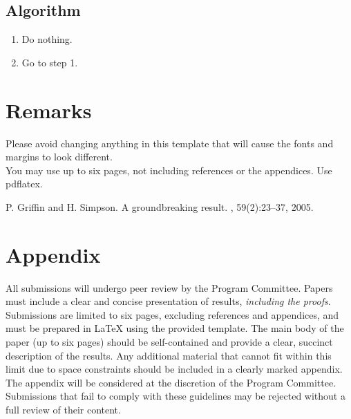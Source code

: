 \documentclass{cccg25}
\begin{document}
\subsection{Algorithm}

\begin{enumerate}
\item
Do nothing.
\item
Go to step 1.
\end{enumerate}




\section{Remarks}   %
Please avoid changing anything in this template that will cause the fonts and margins to look different.\\
You may use up to six pages, not including references or the appendices.
Use pdflatex.\\



\small


\begin{thebibliography}{99}

P. Griffin and H. Simpson.
\newblock A groundbreaking result.
, 59(2):23--37, 2005.

\end{thebibliography}


\newpage
\section*{Appendix}
All submissions will undergo peer review by the Program Committee. Papers must include a clear and concise presentation of results, \emph{including the proofs}. Submissions are limited to six pages, excluding references and appendices, and must be prepared in LaTeX using the provided template.
The main body of the paper (up to six pages) should be self-contained and provide a clear, succinct description of the results. Any additional material that cannot fit within this limit due to space constraints should be included in a clearly marked appendix. The appendix will be considered at the discretion of the Program Committee. Submissions that fail to comply with these guidelines may be rejected without a full review of their content.
\end{document}

